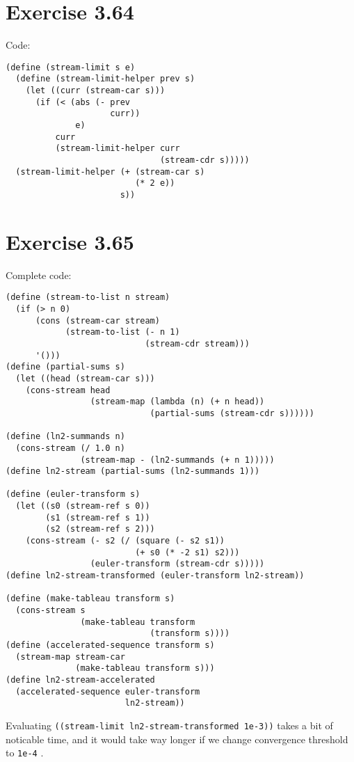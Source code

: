 \documentclass[../main.tex]{subfiles}
\begin{document}
\section{Exercise 3.64}

Code:

\begin{lstlisting}
(define (stream-limit s e)
  (define (stream-limit-helper prev s)
    (let ((curr (stream-car s)))
      (if (< (abs (- prev
                     curr))
              e)
          curr
          (stream-limit-helper curr
                               (stream-cdr s)))))
  (stream-limit-helper (+ (stream-car s)
                          (* 2 e))
                       s))
\end{lstlisting}

\section{Exercise 3.65}

Complete code:

\begin{lstlisting}
(define (stream-to-list n stream)
  (if (> n 0)
      (cons (stream-car stream)
            (stream-to-list (- n 1)
                            (stream-cdr stream)))
      '()))
(define (partial-sums s)
  (let ((head (stream-car s)))
    (cons-stream head
                 (stream-map (lambda (n) (+ n head))
                             (partial-sums (stream-cdr s))))))

(define (ln2-summands n)
  (cons-stream (/ 1.0 n)
               (stream-map - (ln2-summands (+ n 1)))))
(define ln2-stream (partial-sums (ln2-summands 1)))

(define (euler-transform s)
  (let ((s0 (stream-ref s 0))
        (s1 (stream-ref s 1))
        (s2 (stream-ref s 2)))
    (cons-stream (- s2 (/ (square (- s2 s1))
                          (+ s0 (* -2 s1) s2)))
                 (euler-transform (stream-cdr s)))))
(define ln2-stream-transformed (euler-transform ln2-stream))

(define (make-tableau transform s)
  (cons-stream s
               (make-tableau transform
                             (transform s))))
(define (accelerated-sequence transform s)
  (stream-map stream-car
              (make-tableau transform s)))
(define ln2-stream-accelerated
  (accelerated-sequence euler-transform
                        ln2-stream))
\end{lstlisting}

Evaluating \lstinline{((stream-limit ln2-stream-transformed 1e-3))} takes a bit of noticable time, and it would take way longer if we change convergence threshold to \lstinline{1e-4} .
\end{document}
